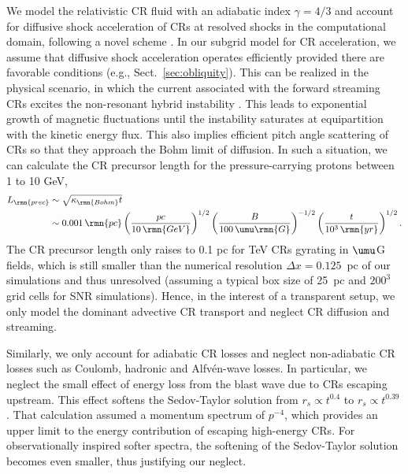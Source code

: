 \documentclass[8pt,a4paper,usenatbib]{mnras}
\begin{document}
We model the relativistic CR fluid with an adiabatic index $\gamma = 4/3$ and
account for diffusive shock acceleration of CRs at resolved shocks in the
computational domain, following a novel scheme \citep{2017MNRAS.465.4500P}.
In our subgrid model for CR acceleration, we assume that diffusive shock
  acceleration operates efficiently provided there are favorable conditions
  (e.g., Sect.~\ref{sec:obliquity}). This can be realized in the physical
  scenario, in which the current associated with the forward streaming CRs
  excites the non-resonant hybrid instability \citep{2004MNRAS.353..550B}. This
  leads to exponential growth of magnetic fluctuations until the instability
  saturates at equipartition with the kinetic energy flux. This also implies
  efficient pitch angle scattering of CRs so that they approach the Bohm limit
  of diffusion. In such a situation, we can calculate the CR precursor length
  for the pressure-carrying protons between 1 to 10 GeV,
  \begin{align}
    \label{eq:direction}
    L_\rmn{prec} &\sim\sqrt{\kappa_\rmn{Bohm}t}\\
    &\sim0.001\,\rmn{pc}
    \left(\frac{pc}{10\,\rmn{GeV}}\right)^{1/2}
    \left(\frac{B}{100\,\umu\rmn{G}}\right)^{-1/2}
    \left(\frac{t}{10^3\,\rmn{yr}}\right)^{1/2}.\nonumber
  \end{align}
  The CR precursor length only raises to 0.1 pc for TeV CRs gyrating in $\umu$G
  fields, which is still smaller than the numerical resolution $\Delta
  x=0.125$~pc of our simulations and thus unresolved (assuming a typical box
  size of 25~pc and $200^3$ grid cells for SNR simulations). Hence, in the
interest of a transparent setup, we only model the dominant advective CR
transport and neglect CR diffusion and streaming.

Similarly, we only account for adiabatic CR losses and neglect non-adiabatic CR
losses such as Coulomb, hadronic and Alfv\'en-wave losses. In particular, we
  neglect the small effect of energy loss from the blast wave due to CRs
  escaping upstream. This effect softens the Sedov-Taylor solution from $r_s
  \propto t^{0.4}$ to $r_s \propto t^{0.39}$ \citep{2015MNRAS.447.2224B}. That
  calculation assumed a momentum spectrum of $p^{-4}$, which provides an upper
  limit to the energy contribution of escaping high-energy CRs. For
  observationally inspired softer spectra, the softening of the Sedov-Taylor
  solution becomes even smaller, thus justifying our neglect.
\end{document}
